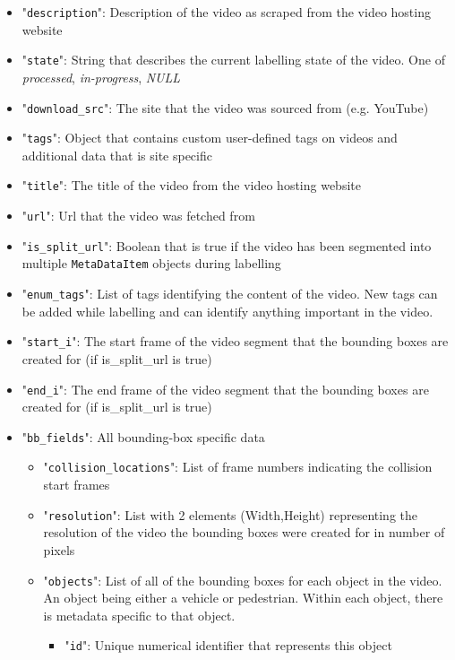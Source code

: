 \documentclass[letterpaper, 10 pt, conference]{ieeeconf}
\begin{document}
\begin{itemize}
  \item "\texttt{description}": Description of the video as scraped from the video hosting website
  \item "\texttt{state}": String that describes the current labelling state of the video. One of \textit{processed}, \textit{in-progress}, \textit{NULL}
  \item "\texttt{download\_src}": The site that the video was sourced from (e.g. YouTube)
  \item "\texttt{tags}": Object that contains custom user-defined tags on videos and additional data that is site specific
  \item "\texttt{title}": The title of the video from the video hosting website
  \item "\texttt{url}": Url that the video was fetched from
  \item "\texttt{is\_split\_url}": Boolean that is true if the video has been segmented into multiple \texttt{MetaDataItem} objects during labelling
  \item "\texttt{enum\_tags}": List of tags identifying the content of the video. New tags can be added while labelling and can identify anything important in the video.
  \item "\texttt{start\_i}": The start frame of the video segment that the bounding boxes are created for (if is\_split\_url is true)
  \item "\texttt{end\_i}": The end frame of the video segment that the bounding boxes are created for (if is\_split\_url is true)
  \item "\texttt{bb\_fields}": All bounding-box specific data
  \begin{itemize}
    \item "\texttt{collision\_locations}": List of frame numbers indicating the collision start frames
    \item "\texttt{resolution}": List with 2 elements (Width,Height) representing the resolution of the video the bounding boxes were created for in number of pixels 
    \item "\texttt{objects}": List of all of the bounding boxes for each object in the video. An object being either a vehicle or pedestrian. Within each object, there is metadata specific to that object.
    \begin{itemize}
      \item "\texttt{id}": Unique numerical identifier that represents this object

\end{itemize}
\end{itemize}
\end{itemize}
\end{document}
